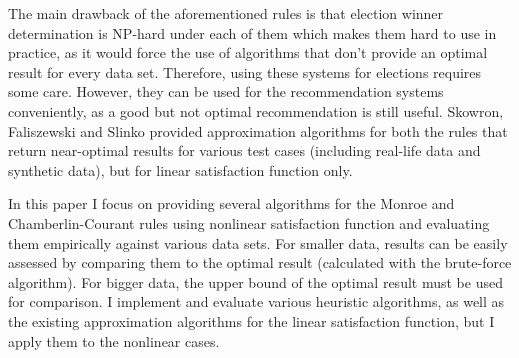 The main drawback of the aforementioned rules is that election winner determination is NP-hard under each of them which makes them hard to use in practice, as it would force the use of algorithms that don’t provide an optimal result for every data set. Therefore, using these systems for elections requires some care. However, they can be used for the recommendation systems conveniently, as a good but not optimal recommendation is still useful. Skowron, Faliszewski and Slinko provided approximation algorithms for both the rules that return near-optimal results for various test cases (including real-life data and synthetic data), but for linear satisfaction function only.

In this paper I focus on providing several algorithms for the Monroe and Chamberlin-Courant rules using nonlinear satisfaction function and evaluating them empirically against various data sets. For smaller data, results can be easily assessed by comparing them to the optimal result (calculated with the brute-force algorithm). For bigger data, the upper bound of the optimal result must be used for comparison. I implement and evaluate various heuristic algorithms, as well as the existing approximation algorithms for the linear satisfaction function, but I apply them to the nonlinear cases.

